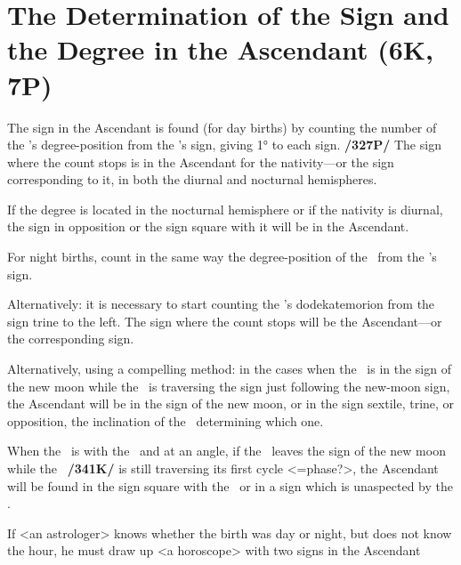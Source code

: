 \section{The Determination of the Sign and the Degree in the Ascendant (6K, 7P)}

The sign in the Ascendant is found (for day births) by counting the number of the \Sun's degree-position from the \Sun's sign, giving 1° to each sign. \textbf{/327P/} The sign where the count stops is in the Ascendant for the nativity—or the sign corresponding to it, in both the diurnal and nocturnal hemispheres. 

If the degree is located in the nocturnal hemisphere or if the nativity is diurnal, the sign in opposition or the sign square with it will be in the Ascendant. 

For night births, count in the same way the degree-position of the \Moon\, from the \Moon’s sign. 

Alternatively: it is necessary to start counting the \Sun’s dodekatemorion from the sign trine to the left. The sign where the count stops will be the Ascendant—or the corresponding sign.

Alternatively, using a compelling method: in the cases when the \Sun\, is in the sign of the new moon while the \Moon\, is traversing the sign just following the new-moon sign, the Ascendant will be in the sign of the new moon, or in the sign sextile, trine, or opposition, the inclination of the \Moon\, determining which one. 

When the \Moon\, is with the \Sun\, and at an angle, if the \Sun\, leaves the sign of the new moon while the \Moon\, \textbf{/341K/} is still traversing its first cycle <=phase?>, the Ascendant will be found in the sign square with the \Moon\, or in a sign which is unaspected by the \Moon. 

If <an astrologer> knows whether the birth was day or night, but does not know the hour, he must draw up <a horoscope> with two signs in the Ascendant

\newpage